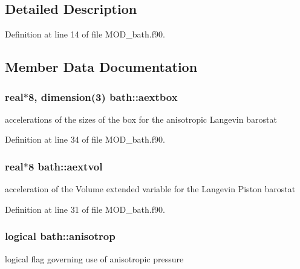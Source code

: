 \subsection{Detailed Description}


Definition at line 14 of file M\-O\-D\-\_\-bath.\-f90.



\subsection{Member Data Documentation}
\hypertarget{classbath_ad443bea48f49b46247715f8a9b556897}{
\subsubsection[{aextbox}]{\setlength{\rightskip}{0pt plus 5cm}real$\ast$8, dimension(3) bath\-::aextbox}}\label{classbath_ad443bea48f49b46247715f8a9b556897}


accelerations of the sizes of the box for the anisotropic Langevin barostat 



Definition at line 34 of file M\-O\-D\-\_\-bath.\-f90.

\hypertarget{classbath_a8e3c36b77876c501d390f5d4cd5e3214}{
\subsubsection[{aextvol}]{\setlength{\rightskip}{0pt plus 5cm}real$\ast$8 bath\-::aextvol}}\label{classbath_a8e3c36b77876c501d390f5d4cd5e3214}


acceleration of the Volume extended variable for the Langevin Piston barostat 



Definition at line 31 of file M\-O\-D\-\_\-bath.\-f90.

\hypertarget{classbath_adf1ab4c8599e36e94daa6c168a50dc42}{
\subsubsection[{anisotrop}]{\setlength{\rightskip}{0pt plus 5cm}logical bath\-::anisotrop}}\label{classbath_adf1ab4c8599e36e94daa6c168a50dc42}


logical flag governing use of anisotropic pressure 




